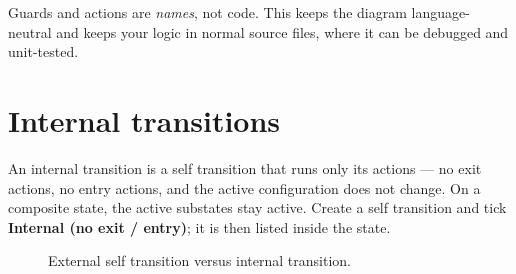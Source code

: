 \documentclass[11pt,a4paper,openany]{report}
\newcommand{\ui}[1]{\textsf{\textbf{#1}}}
\begin{document}
\begin{note}
Guards and actions are \emph{names}, not code. This keeps the diagram language-neutral and keeps your
logic in normal source files, where it can be debugged and unit-tested.
\end{note}

\section{Internal transitions}
An internal transition is a self transition that runs only its actions --- no exit actions, no entry
actions, and the active configuration does not change. On a composite state, the active substates stay
active. Create a self transition and tick \ui{Internal (no exit / entry)}; it is then listed inside the
state.

\begin{figure}[H]
\centering
{}
\caption{External self transition versus internal transition.}
\end{figure}
\end{document}
